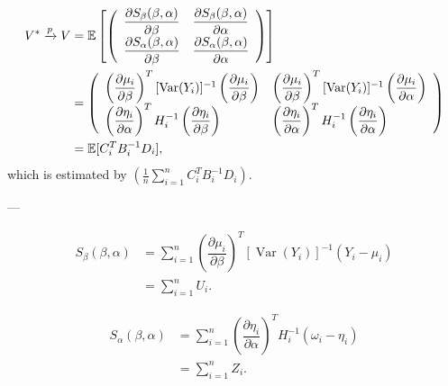 \documentclass[UTF8,a4paper,10pt]{article}
\begin{document}
\begin{equation*}
  \begin{aligned}
    V^{*}\xrightarrow{p} V 
    &= \operatorname{\mathbb{E}}\left[\left(\begin{array}{ll}\dfrac{\partial S_{\beta}(\beta, \alpha)}{\partial \beta} & \dfrac{\partial S_{\beta}(\beta, \alpha)}{\partial \alpha} \\ \dfrac{\partial S_{\alpha}(\beta, \alpha)}{\partial \beta} & \dfrac{\partial S_{\alpha}(\beta, \alpha)}{\partial \alpha}\end{array}\right)\right]\\
    &=\left(\begin{array}{ll}\left(\dfrac{\partial \mu_{i}}{\partial \beta}\right)^{T}[\operatorname{Var}(Y_i)]^{-1}\left(\dfrac{\partial \mu_{i}}{\partial \beta}\right) 
      & \left(\dfrac{\partial \mu_{i}}{\partial \beta}\right)^{T}[\operatorname{Var}(Y_i)]^{-1}\left(\dfrac{\partial \mu_{i}}{\partial \alpha}\right) \\ 
      \left(\dfrac{\partial \eta_{i}}{\partial \alpha}\right)^{T} H_{i}^{-1}\left(\dfrac{\partial \eta_{i}}{\partial \beta}\right) 
      & \left(\dfrac{\partial \eta_{i}}{\partial \alpha}\right)^{T} H_{i}^{-1}\left(\dfrac{\partial \eta_{i}}{\partial \alpha}\right)\end{array}\right)\\
      &=\operatorname{\mathbb{E}}[C_i^TB_i^{-1}D_i],
  \end{aligned}
\end{equation*}
which is estimated by \(\left(\frac{1}{n} \sum_{i=1}^{n} C_{i}^{T} B_{i}^{-1} D_{i}\right)\).

---


\begin{equation*}
  \begin{aligned}
  S_{\beta}(\beta, \alpha)
  &=\sum_{i=1}^{n}\left(\dfrac{\partial \mu_{i}}{\partial \beta}\right)^{T}\left[\operatorname{Var}\left(Y_{i}\right)\right]^{-1}\left(Y_{i}-\mu_{i}\right)\\
  &=\sum_{i=1}^{n}U_i.
\end{aligned}
\end{equation*}

\begin{equation*}
  \begin{aligned}
S_{\alpha}(\beta, \alpha)
&=\sum_{i=1}^{n}\left(\dfrac{\partial \eta_{i}}{\partial \alpha}\right)^{T} H_{i}^{-1}\left(\omega_{i}-\eta_{i}\right)\\
&=\sum_{i=1}^{n}Z_i.
\end{aligned}
\end{equation*}
\end{document}
